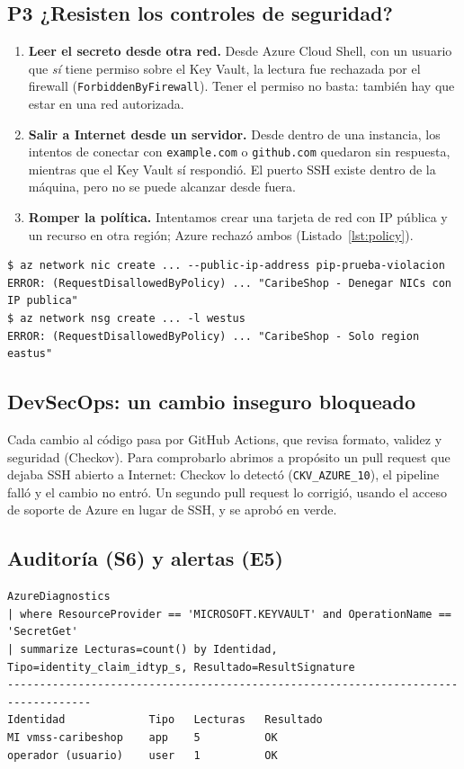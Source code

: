 \documentclass[11pt,letterpaper]{article}
\begin{document}
\subsection{P3 ¿Resisten los controles de seguridad?}
\begin{enumerate}
  \item \textbf{Leer el secreto desde otra red.} Desde Azure Cloud Shell, con un usuario que
        \emph{sí} tiene permiso sobre el Key Vault, la lectura fue rechazada por el firewall
        (\texttt{ForbiddenByFirewall}). Tener el permiso no basta: también hay que estar en una
        red autorizada.
  \item \textbf{Salir a Internet desde un servidor.} Desde dentro de una instancia, los intentos de
        conectar con \texttt{example.com} o \texttt{github.com} quedaron sin respuesta, mientras
        que el Key Vault sí respondió. El puerto SSH existe dentro de la máquina, pero no se puede
        alcanzar desde fuera.
  \item \textbf{Romper la política.} Intentamos crear una tarjeta de red con IP pública y un recurso
        en otra región; Azure rechazó ambos (Listado~\ref{lst:policy}).
\end{enumerate}

\begin{lstlisting}[caption={P3.3: Azure Policy rechaza los recursos prohibidos (salida abreviada).},label={lst:policy},language={}]
$ az network nic create ... --public-ip-address pip-prueba-violacion
ERROR: (RequestDisallowedByPolicy) ... "CaribeShop - Denegar NICs con IP publica"
$ az network nsg create ... -l westus
ERROR: (RequestDisallowedByPolicy) ... "CaribeShop - Solo region eastus"
\end{lstlisting}

\subsection{DevSecOps: un cambio inseguro bloqueado}
Cada cambio al código pasa por GitHub Actions, que revisa formato, validez y seguridad (Checkov).
Para comprobarlo abrimos a propósito un pull request que dejaba SSH abierto a Internet: Checkov lo
detectó (\texttt{CKV\_AZURE\_10}), el pipeline falló y el cambio no entró. Un segundo pull request
lo corrigió, usando el acceso de soporte de Azure en lugar de SSH, y se aprobó en verde.

\subsection{Auditoría (S6) y alertas (E5)}
\begin{lstlisting}[caption={S6: consulta KQL de lecturas del secreto y resultado.},label={lst:kql},language={}]
AzureDiagnostics
| where ResourceProvider == 'MICROSOFT.KEYVAULT' and OperationName == 'SecretGet'
| summarize Lecturas=count() by Identidad, Tipo=identity_claim_idtyp_s, Resultado=ResultSignature
-----------------------------------------------------------------------------------
Identidad             Tipo   Lecturas   Resultado
MI vmss-caribeshop    app    5          OK
operador (usuario)    user   1          OK
\end{lstlisting}
\end{document}
